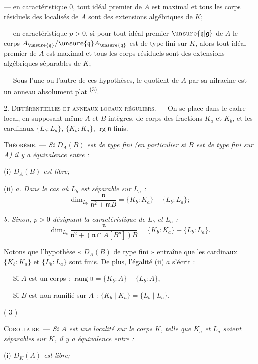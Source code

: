 --- en caractéristique $0$, tout idéal premier de $A$ est maximal et tous les corps résiduels des localisés de $A$ sont des extensions algébriques de $K$;

--- en caractéristique $p>0$, si pour tout idéal premier $\unsure{\mathfrak q|\mathfrak g}$ de $A$ le corps $A_{\unsure{\mathfrak q}}/\unsure{\mathfrak q}A_{\unsure{\mathfrak q}}$ est de type fini sur $K$, alors tout idéal premier de $A$ est maximal et tous les corps résiduels sont des extensions algébriques séparables de $K$;

--- Sous l'une ou l'autre de ces hypothèses, le quotient de $A$ par sa nilracine est un anneau absolument plat \textsuperscript{(3)}.

2. \textsc{Différentielles et anneaux locaux réguliers.} --- On se place dans le cadre local, en supposant même $A$ et $B$ intègres, de corps des fractions $K_a$ et $K_b$, et les cardinaux $\{L_b:L_a\}$, $\{K_b:K_a\}$, $\operatorname{rg}\mathfrak n$ finis.

\textsc{Théorème.} --- \textit{Si $D_A(B)$ est de type fini (en particulier si $B$ est de type fini sur $A$) il y a équivalence entre :}

(i) \textit{$D_A(B)$ est libre;}

(ii) \textit{a. Dans le cas où $L_b$ est séparable sur $L_a$ :}
\[
\dim_{L_b}\frac{\mathfrak n}{\mathfrak n^2+\mathfrak mB}=\{K_b:K_a\}-\{L_b:L_a\};
\]

\textit{b. Sinon, $p>0$ désignant la caractéristique de $L_b$ et $L_a$ :}
\[
\dim_{L_b}\frac{\mathfrak n}{\mathfrak n^2+(\mathfrak n\cap A[B^p])B}=\{K_b:K_a\}-\{L_b:L_a\}.
\]

Notons que l'hypothèse « $D_A(B)$ de type fini » entraîne que les cardinaux $\{K_b:K_a\}$ et $\{L_b:L_a\}$ sont finis. De plus, l'égalité (ii) $a$ s'écrit :

--- Si $A$ est un corps : $\operatorname{rang}\mathfrak n=\{K_b:A\}-\{L_b:A\}$,

--- Si $B$ est non ramifié sur $A$ : $\{K_b\mid K_a\}=\{L_b\mid L_a\}$.


\begin{center}( 3 )\end{center}

\textsc{Corollaire.} --- \textit{Si $A$ est une localité sur le corps $K$, telle que $K_a$ et $L_a$ soient séparables sur $K$, il y a équivalence entre :}

(i) \textit{$D_K(A)$ est libre;}

